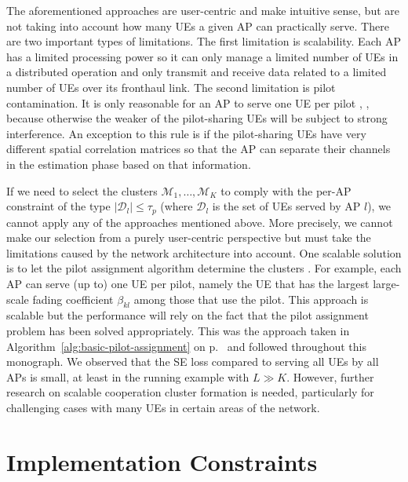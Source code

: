 The aforementioned approaches are user-centric and make intuitive sense, but are not taking into account how many UEs a given AP can practically serve. There are two important types of limitations. The first limitation is scalability. Each AP has a limited processing power so it can only manage a limited number of UEs in a distributed operation and only transmit and receive data related to a limited number of UEs over its fronthaul link. The second limitation is pilot contamination. It is only reasonable for an AP to serve one UE per pilot \cite{Bjornson2020a}, \cite{Sabbagh2018a}, because otherwise the weaker of the pilot-sharing UEs will be subject to strong interference. An exception to this rule is if the pilot-sharing UEs have very different spatial correlation matrices so that the AP can separate their channels in the estimation phase based on that information.


If we need to select the clusters $\mathcal{M}_1,\ldots,\mathcal{M}_K$ to comply with the per-AP constraint of the type $|\mathcal{D}_l| \leq \tau_p$ (where $\mathcal{D}_l$ is the set of UEs served by AP $l$), we cannot apply any of the approaches mentioned above. More precisely, we cannot make our selection from a purely user-centric perspective but must take the limitations caused by the network architecture into account.
One scalable solution is to let the pilot assignment algorithm determine the clusters \cite{Bjornson2020a}. For example, each AP can serve (up to) one UE per pilot, namely the UE that has the largest large-scale fading coefficient $\beta_{kl}$ among those that use the pilot. This approach is scalable but the performance will rely on the fact that the pilot assignment problem has been solved appropriately. This was the approach taken in Algorithm~\ref{alg:basic-pilot-assignment} on p.~\pageref{alg:basic-pilot-assignment} and followed throughout this monograph.
We observed that the SE loss compared to serving all UEs by all APs is small, at least in the running example with $L \gg K$. 
However, further research on scalable cooperation cluster formation is needed, particularly for challenging cases with many UEs in certain areas of the network.



\section{Implementation Constraints}
\label{sec:implementation-constraints}

